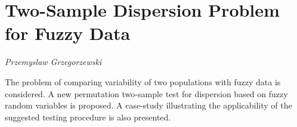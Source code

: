 \documentclass[../booklet.tex]{subfiles}
\begin{document}
\section[Two-Sample Dispersion Problem for Fuzzy Data. {\it Przemyslaw Grzegorzewski}]{Two-Sample Dispersion Problem for Fuzzy Data}

\begin{center}
  {\it Przemyslaw Grzegorzewski}
\end{center}

\vskip 0.8cm


The problem of comparing variability of two populations with fuzzy data is considered. A new permutation two-sample test for dispersion based on fuzzy random variables is proposed. A case-study illustrating the applicability of the suggested testing procedure is also presented.

\end{document}
